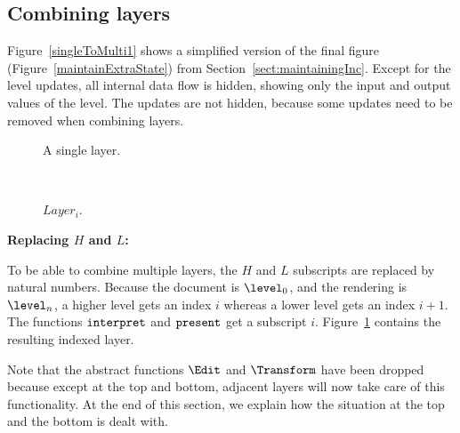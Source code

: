 \subsection{Combining layers}

Figure~\ref{singleToMulti1} shows a simplified version of the final figure (Figure~\ref{maintainExtraState}) from Section~\ref{sect:maintainingInc}. Except for the level updates, all internal data flow is hidden, showing only the input and output values of the level. The updates are not hidden, because some updates need to be removed when combining layers.

\begin{figure}[h]
  \hfill
  \begin{minipage}[b]{.45\textwidth}
    \begin{center}  
      \caption{A single layer.} \label{singleToMulti1}
    \end{center}
  \end{minipage}
  \hfill
  \begin{minipage}[b]{.45\textwidth}
    \begin{center}  
      \\ \vspace{0.765cm}
      \caption{$Layer_i$.} \label{singleToMulti2}
    \end{center}
  \end{minipage}
  \hfill
\end{figure}

\bigskip
{\bf Replacing $H$ and $L$:}

To be able to combine multiple layers, the $H$ and $L$ subscripts are replaced by natural numbers. Because the document is $\level_0$, and the rendering is $\level_n$, a higher level gets an index $i$ whereas a lower level gets an index $i+1$. The functions ${\tt interpret}$ and ${\tt present}$ get a subscript $i$. Figure~\ref{singleToMulti2} contains the resulting indexed layer. 

Note that the abstract functions $\Edit$ and $\Transform$ have been dropped because except at the top and bottom, adjacent layers will now take care of this functionality. At the end of this section, we explain how the situation at the top and the bottom is dealt with.

